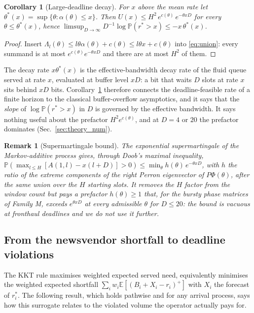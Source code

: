 \documentclass[journal]{IEEEtran}
\newtheorem{corollary}{Corollary}
\newtheorem{remark}{Remark}
\newcommand{\rstar}{r^{\ast}}
\newcommand{\E}{\mathbb{E}}
\newcommand{\Prob}{\mathbb{P}}
\begin{document}
\begin{corollary}[Large-deadline decay]
\label{cor:decay}
For $x$ above the mean rate let $\theta^\ast(x) = \sup\{\theta : \alpha(\theta) \le x\}$. Then $U(x) \le H^2\, e^{c(\theta)}\, e^{-\theta x D}$ for every $\theta \le \theta^\ast(x)$, hence
$\limsup_{D \to \infty} D^{-1}\log\Prob(\rstar > x) \le -x\,\theta^\ast(x)$.
\end{corollary}
\begin{proof}
Insert $\Lambda_l(\theta) \le l\theta\alpha(\theta) + c(\theta) \le l\theta x + c(\theta)$ into \eqref{eq:union}: every summand is at most $e^{c(\theta)}e^{-\theta x D}$ and there are at most $H^2$ of them.
\end{proof}
The decay rate $x\theta^\ast(x)$ is the effective-bandwidth decay rate of the fluid queue served at rate $x$, evaluated at buffer level $xD$: a bit that waits $D$ slots at rate $x$ sits behind $xD$ bits. Corollary~\ref{cor:decay} therefore connects the deadline-feasible rate of a finite horizon to the classical buffer-overflow asymptotics, and it says that the \emph{slope} of $\log\Prob(\rstar > x)$ in $D$ is governed by the effective bandwidth. It says nothing useful about the prefactor $H^2 e^{c(\theta)}$, and at $D = 4$ or $20$ the prefactor dominates (Sec.~\ref{sec:theory_num}).

\begin{remark}[Supermartingale bound]
The exponential supermartingale of the Markov-additive process \cite{duffield1994} gives, through Doob's maximal inequality, $\Prob(\max_{l \le H}[A(1, l) - x(l + D)] > 0) \le \min_\theta h(\theta)\, e^{-\theta x D}$, with $h$ the ratio of the extreme components of the right Perron eigenvector of $P\Phi(\theta)$, after the same union over the $H$ starting slots. It removes the $H$ factor from the window count but pays a prefactor $h(\theta) \ge 1$ that, for the bursty phase matrices of Family M, exceeds $e^{\theta x D}$ at every admissible $\theta$ for $D \le 20$: the bound is vacuous at fronthaul deadlines and we do not use it further.
\end{remark}

\subsection{From the newsvendor shortfall to deadline violations}
The KKT rule maximises weighted expected served need, equivalently minimises the weighted expected shortfall $\sum_i w_i \E[(B_i + X_i - r_i)^+]$ with $X_i$ the forecast of $\rstar_i$. The following result, which holds pathwise and for any arrival process, says how this surrogate relates to the violated volume the operator actually pays for.
\end{document}
